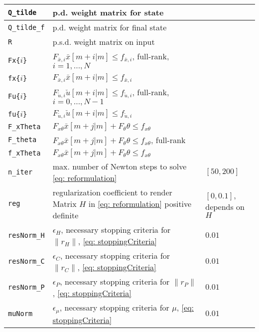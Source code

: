 \documentclass[letter]{article}
\begin{document}
\begin{sffamily}
\begin{table}[!htdp]
\begin{center}
\begin{tabular}{|l|l|l|}
 \texttt{Q\_tilde} & p.d. weight matrix for state & \\ \hline
 \texttt{Q\_tilde\_f} & p.d. weight matrix for final state & \\ \hline
 \texttt{R} & p.s.d. weight matrix on input & \\ \hline
 \texttt{Fx\{$i$\}} & $F_{\bar{x},i}\bar{x}[m+i|m] \leq f_{\bar{x},i}$, full-rank, $i=1,\ldots,N$ & \\ \hline
 \texttt{fx\{$i$\}} & $F_{\bar{x},i}\bar{x}[m+i|m] \leq f_{\bar{x},i}$ & \\ \hline
 \texttt{Fu\{$i$\}} & $F_{\check{u},i}\check{u}[m+i|m] \leq f_{\check{u},i}$, full-rank, $i=0,\ldots,N-1$ & \\ \hline
 \texttt{fu\{$i$\}} & $F_{\check{u},i}\check{u}[m+i|m] \leq f_{\check{u},i}$ & \\ \hline
 \texttt{F\_xTheta} & $F_{x\theta}\bar{x}[m+j|m] + F_\theta \theta \leq f_{x\theta}$ & \\ \hline
 \texttt{F\_theta} & $F_{x\theta}\bar{x}[m+j|m] + F_\theta \theta \leq f_{x\theta}$, full-rank & \\ \hline
 \texttt{f\_xTheta} & $F_{x\theta}\bar{x}[m+j|m] + F_\theta \theta \leq f_{x\theta}$ & \\ \hline \hline

 \texttt{n\_iter} & max. number of Newton steps to solve \eqref{eq: reformulation} & $[50,200]$ \\ \hline
 \texttt{reg} & regularization coefficient to render Matrix $H$ in \eqref{eq: reformulation} positive definite & $[0,0.1]$, depends on $H$ \\ \hline
 \texttt{resNorm\_H} & $\epsilon_H$, necessary stopping criteria for $\|r_H\|$, \eqref{eq: stoppingCriteria} & $0.01$ \\ \hline
 \texttt{resNorm\_C} & $\epsilon_C$, necessary stopping criteria for $\|r_C\|$, \eqref{eq: stoppingCriteria} & $0.01$ \\ \hline
 \texttt{resNorm\_P} & $\epsilon_P$, necessary stopping criteria for $\|r_P\|$, \eqref{eq: stoppingCriteria} & $0.01$ \\ \hline
 \texttt{muNorm} & $\epsilon_\mu$, necessary stopping criteria for $\mu$, \eqref{eq: stoppingCriteria} & $0.01$ \\ \hline

\end{tabular}
\end{center}
\label{tab: parameters Init.m}
\end{table}


\end{sffamily}
\end{document}
